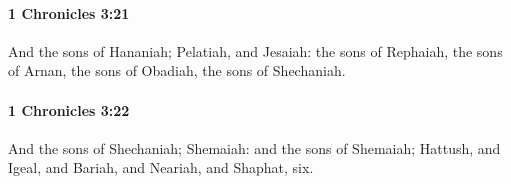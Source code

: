 		\paragraph{1 Chronicles 3:21} %
			\label{1CHRONICLES-3-21}

			And the sons of Hananiah; Pelatiah, and Jesaiah: the sons of Rephaiah, the sons of Arnan, the sons of Obadiah, the sons of Shechaniah.


		\paragraph{1 Chronicles 3:22} %
			\label{1CHRONICLES-3-22}

			And the sons of Shechaniah; Shemaiah: and the sons of Shemaiah; Hattush, and Igeal, and Bariah, and Neariah, and Shaphat, six.


